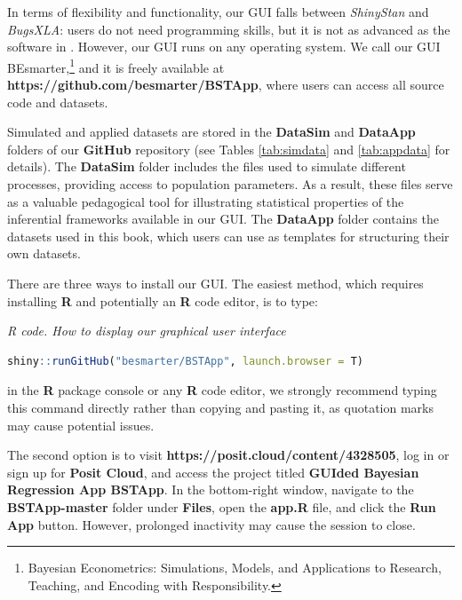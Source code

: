 In terms of flexibility and functionality, our GUI falls between \textit{ShinyStan} and \textit{BugsXLA}: users do not need programming skills, but it is not as advanced as the software in \cite{Karabatsos2016}. However, our GUI runs on any operating system. We call our GUI BEsmarter,\footnote{Bayesian Econometrics: Simulations, Models, and Applications to Research, Teaching, and Encoding with Responsibility.} and it is freely available at \textbf{https://github.com/besmarter/BSTApp}, where users can access all source code and datasets.

Simulated and applied datasets are stored in the \textbf{DataSim} and \textbf{DataApp} folders of our \textbf{GitHub} repository (see Tables \ref{tab:simdata} and \ref{tab:appdata} for details). The \textbf{DataSim} folder includes the files used to simulate different processes, providing access to population parameters. As a result, these files serve as a valuable pedagogical tool for illustrating statistical properties of the inferential frameworks available in our GUI. The \textbf{DataApp} folder contains the datasets used in this book, which users can use as templates for structuring their own datasets.

There are three ways to install our GUI. The easiest method, which requires installing \textbf{R} and potentially an \textbf{R} code editor, is to type:

\begin{tcolorbox}[enhanced,width=4.67in,center upper,
	fontupper=\large\bfseries,drop shadow southwest,sharp corners]
	\textit{R code. How to display our graphical user interface}
	\begin{VF}
		\begin{lstlisting}[language=R]
		shiny::runGitHub("besmarter/BSTApp", launch.browser = T)\end{lstlisting}
	\end{VF}
\end{tcolorbox} 

in the \textbf{R} package console or any \textbf{R} code editor, we strongly recommend typing this command directly rather than copying and pasting it, as quotation marks may cause potential issues.

The second option is to visit \textbf{https://posit.cloud/content/4328505}, log in or sign up for \textbf{Posit Cloud}, and access the project titled \textbf{GUIded Bayesian Regression App BSTApp}. In the bottom-right window, navigate to the \textbf{BSTApp-master} folder under \textbf{Files}, open the \textbf{app.R} file, and click the \textbf{Run App} button. However, prolonged inactivity may cause the session to close.

